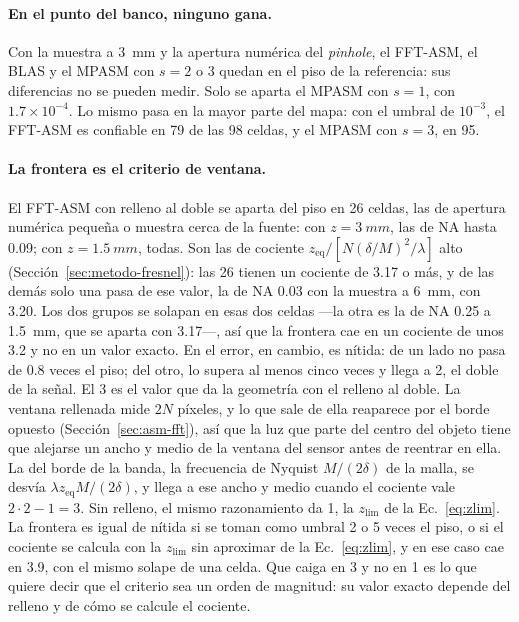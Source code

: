 \paragraph{En el punto del banco, ninguno gana.} Con la muestra a
\SI{3}{mm} y la apertura numérica del \emph{pinhole}, el FFT-ASM, el BLAS y el
MPASM con $s = 2$ o 3 quedan en el piso de la referencia: sus diferencias no
se pueden medir. Solo se aparta el MPASM con $s = 1$, con
$1.7\times10^{-4}$. Lo mismo pasa en la mayor parte del mapa: con el umbral de
$10^{-3}$, el FFT-ASM es confiable en 79 de las 98 celdas, y el MPASM con
$s = 3$, en 95.

\paragraph{La frontera es el criterio de ventana.} El FFT-ASM con relleno al
doble se aparta del piso en 26 celdas, las de apertura numérica pequeña o
muestra cerca de la fuente: con $z = \SI{3}{mm}$, las de NA hasta 0.09; con
$z = \SI{1.5}{mm}$, todas. Son las de cociente
$z_\mathrm{eq}/[N(\delta/M)^2/\lambda]$ alto
(Sección~\ref{sec:metodo-fresnel}): las 26 tienen un cociente de 3.17 o más,
y de las demás solo una pasa de ese valor, la de NA 0.03 con la muestra a
\SI{6}{mm}, con 3.20. Los dos grupos se solapan en esas dos celdas ---la otra
es la de NA 0.25 a \SI{1.5}{mm}, que se aparta con 3.17---, así que la
frontera cae en un cociente de unos 3.2 y no en un valor exacto. En el error,
en cambio, es nítida: de un lado no pasa de 0.8 veces el piso; del otro, lo
supera al menos cinco veces y llega a 2, el doble de la señal. El 3 es el valor que da la geometría con el relleno al
doble. La ventana rellenada mide $2N$ píxeles, y lo que sale de ella reaparece
por el borde opuesto (Sección~\ref{sec:asm-fft}), así que la luz que parte del
centro del objeto tiene que alejarse un ancho y medio de la ventana del sensor
antes de reentrar en ella. La del borde de la banda, la frecuencia de Nyquist
$M/(2\delta)$ de la malla, se desvía $\lambda z_\mathrm{eq}M/(2\delta)$, y
llega a ese ancho y medio cuando el cociente vale $2\cdot2 - 1 = 3$. Sin
relleno, el mismo razonamiento da 1, la $z_\mathrm{lim}$ de la
Ec.~\eqref{eq:zlim}. La frontera es igual de nítida si se toman como umbral 2
o 5 veces el piso, o si el cociente se calcula con la $z_\mathrm{lim}$ sin
aproximar de la Ec.~\eqref{eq:zlim}, y en ese caso cae en 3.9, con el mismo
solape de una celda. Que caiga en 3
y no en 1 es lo que quiere decir que el criterio sea un orden de magnitud: su
valor exacto depende del relleno y de cómo se calcule el cociente.

